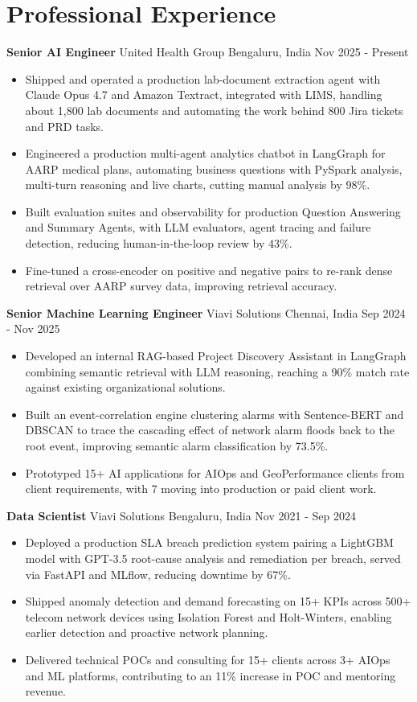 \documentclass[10pt,a4paper]{article}
\newcommand{\role}[4]{\textbf{#1} \textbar{} #2 \hfill #3 \textbar{} #4\par}
\begin{document}
\section{Professional Experience}
\role{Senior AI Engineer}{United Health Group}{Bengaluru, India}{Nov 2025 - Present}
\begin{itemize}
  \item Shipped and operated a production lab-document extraction agent with Claude Opus 4.7 and Amazon Textract, integrated with LIMS, handling about 1,800 lab documents and automating the work behind 800 Jira tickets and PRD tasks.
  \item Engineered a production multi-agent analytics chatbot in LangGraph for AARP medical plans, automating business questions with PySpark analysis, multi-turn reasoning and live charts, cutting manual analysis by 98\%.
  \item Built evaluation suites and observability for production Question Answering and Summary Agents, with LLM evaluators, agent tracing and failure detection, reducing human-in-the-loop review by 43\%.
  \item Fine-tuned a cross-encoder on positive and negative pairs to re-rank dense retrieval over AARP survey data, improving retrieval accuracy.
\end{itemize}
\vspace{3pt}
\role{Senior Machine Learning Engineer}{Viavi Solutions}{Chennai, India}{Sep 2024 - Nov 2025}
\begin{itemize}
  \item Developed an internal RAG-based Project Discovery Assistant in LangGraph combining semantic retrieval with LLM reasoning, reaching a 90\% match rate against existing organizational solutions.
  \item Built an event-correlation engine clustering alarms with Sentence-BERT and DBSCAN to trace the cascading effect of network alarm floods back to the root event, improving semantic alarm classification by 73.5\%.
  \item Prototyped 15+ AI applications for AIOps and GeoPerformance clients from client requirements, with 7 moving into production or paid client work.
\end{itemize}
\vspace{3pt}
\role{Data Scientist}{Viavi Solutions}{Bengaluru, India}{Nov 2021 - Sep 2024}
\begin{itemize}
  \item Deployed a production SLA breach prediction system pairing a LightGBM model with GPT-3.5 root-cause analysis and remediation per breach, served via FastAPI and MLflow, reducing downtime by 67\%.
  \item Shipped anomaly detection and demand forecasting on 15+ KPIs across 500+ telecom network devices using Isolation Forest and Holt-Winters, enabling earlier detection and proactive network planning.
  \item Delivered technical POCs and consulting for 15+ clients across 3+ AIOps and ML platforms, contributing to an 11\% increase in POC and mentoring revenue.
\end{itemize}
\end{document}
